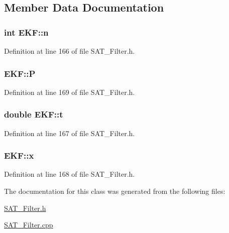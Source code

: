 \subsection{Member Data Documentation}
\hypertarget{classEKF_ad6067337de951c9e7d92d03e02c85ec3}{
\subsubsection[{n}]{\setlength{\rightskip}{0pt plus 5cm}int E\-K\-F\-::n\hspace{0.3cm}{\ttfamily [private]}}}\label{classEKF_ad6067337de951c9e7d92d03e02c85ec3}


Definition at line 166 of file S\-A\-T\-\_\-\-Filter.\-h.

\hypertarget{classEKF_a2f89c66ecddb3b26a3797d5dc48fb2af}{
\subsubsection[{P}]{ E\-K\-F\-::\-P\hspace{0.3cm}{\ttfamily [private]}}}\label{classEKF_a2f89c66ecddb3b26a3797d5dc48fb2af}


Definition at line 169 of file S\-A\-T\-\_\-\-Filter.\-h.

\hypertarget{classEKF_aeff02227c21d484b916191b9af470e31}{
\subsubsection[{t}]{\setlength{\rightskip}{0pt plus 5cm}double E\-K\-F\-::t\hspace{0.3cm}{\ttfamily [private]}}}\label{classEKF_aeff02227c21d484b916191b9af470e31}


Definition at line 167 of file S\-A\-T\-\_\-\-Filter.\-h.

\hypertarget{classEKF_af4e80565150dfd65e4bc508fe3b1d674}{
\subsubsection[{x}]{ E\-K\-F\-::x\hspace{0.3cm}{\ttfamily [private]}}}\label{classEKF_af4e80565150dfd65e4bc508fe3b1d674}


Definition at line 168 of file S\-A\-T\-\_\-\-Filter.\-h.



The documentation for this class was generated from the following files\-:\begin{DoxyCompactItemize}
\item 
\hyperlink{SAT__Filter_8h}{S\-A\-T\-\_\-\-Filter.\-h}\item 
\hyperlink{SAT__Filter_8cpp}{S\-A\-T\-\_\-\-Filter.\-cpp}\end{DoxyCompactItemize}
